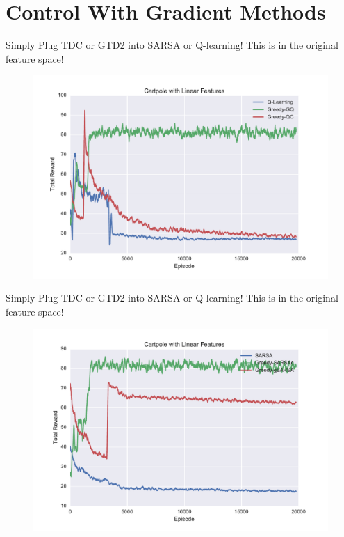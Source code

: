\documentclass{beamer}
\begin{document}
\section{Control With Gradient Methods}
\begin{frame}{Simply Plug TDC or GTD2 into SARSA or Q-learning!}
This is in the original feature space!
  \begin{figure}
    \includegraphics[width=0.7\linewidth]{LinearCartPole-GQ.pdf}
  \end{figure}
\end{frame}
\begin{frame}{Simply Plug TDC or GTD2 into SARSA or Q-learning!}
This is in the original feature space!
  \begin{figure}
    \includegraphics[width=0.7\linewidth]{LinearCartPole-GSarsa.pdf}
  \end{figure}
\end{frame}
\end{document}

